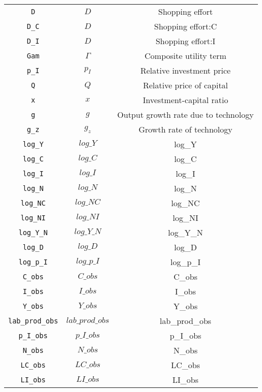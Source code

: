 \begin{center}
\begin{longtable}{ccc}
\texttt{D} & ${D}$ & Shopping effort\\
\texttt{D\_C} & ${D}$ & Shopping effort:C\\
\texttt{D\_I} & ${D}$ & Shopping effort:I\\
\texttt{Gam} & ${\Gamma}$ & Composite utility term\\
\texttt{p\_I} & ${p_I}$ & Relative investment price\\
\texttt{Q} & ${Q}$ & Relative price of capital\\
\texttt{x} & ${x}$ & Investment-capital ratio\\
\texttt{g} & ${g}$ & Output growth rate due to technology\\
\texttt{g\_z} & ${g_z}$ & Growth rate of technology\\
\texttt{log\_Y} & $log\_Y$ & log\_Y\\
\texttt{log\_C} & $log\_C$ & log\_C\\
\texttt{log\_I} & $log\_I$ & log\_I\\
\texttt{log\_N} & $log\_N$ & log\_N\\
\texttt{log\_NC} & $log\_NC$ & log\_NC\\
\texttt{log\_NI} & $log\_NI$ & log\_NI\\
\texttt{log\_Y\_N} & $log\_Y\_N$ & log\_Y\_N\\
\texttt{log\_D} & $log\_D$ & log\_D\\
\texttt{log\_p\_I} & $log\_p\_I$ & log\_p\_I\\
\texttt{C\_obs} & $C\_obs$ & C\_obs\\
\texttt{I\_obs} & $I\_obs$ & I\_obs\\
\texttt{Y\_obs} & $Y\_obs$ & Y\_obs\\
\texttt{lab\_prod\_obs} & $lab\_prod\_obs$ & lab\_prod\_obs\\
\texttt{p\_I\_obs} & $p\_I\_obs$ & p\_I\_obs\\
\texttt{N\_obs} & $N\_obs$ & N\_obs\\
\texttt{LC\_obs} & $LC\_obs$ & LC\_obs\\
\texttt{LI\_obs} & $LI\_obs$ & LI\_obs\\
\hline%
\end{longtable}
\end{center}

